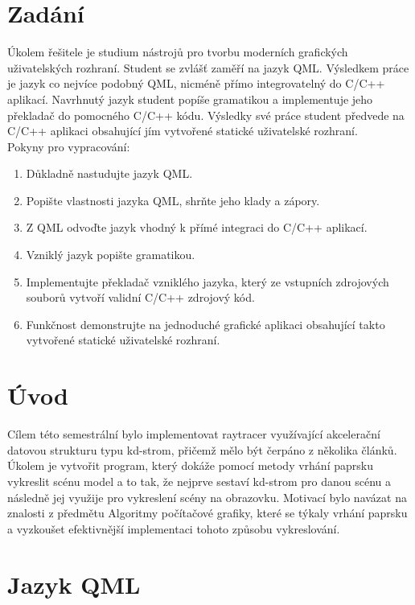 \documentclass[report,11pt]{elsarticle}
\begin{document}
\section{\label{SEC:Intro}Zadání}
Úkolem řešitele je studium nástrojů pro tvorbu moderních grafických uživatelských rozhraní.
Student se zvlášť zaměří na jazyk QML. Výsledkem práce je jazyk co nejvíce podobný QML,
nicméně přímo integrovatelný do C/C++ aplikací. Navrhnutý jazyk student popíše gramatikou a
implementuje jeho překladač do pomocného C/C++ kódu. Výsledky své práce student předvede na
C/C++ aplikaci obsahující jím vytvořené statické uživatelské rozhraní.\\
Pokyny pro vypracování:
\begin{enumerate}
\item Důkladně nastudujte jazyk QML.
\item Popište vlastnosti jazyka QML, shrňte jeho klady a zápory.
\item Z QML odvoďte jazyk vhodný k přímé integraci do C/C++ aplikací.
\item Vzniklý jazyk popište gramatikou.
\item Implementujte překladač vzniklého jazyka, který ze vstupních zdrojových souborů vytvoří
validní C/C++ zdrojový kód.
\item Funkčnost demonstrujte na jednoduché grafické aplikaci obsahující takto vytvořené statické
uživatelské rozhraní.
\end{enumerate}


\section{\label{SEC:Intro}Úvod}
Cílem této semestrální bylo implementovat raytracer využívající akcelerační datovou strukturu typu kd-strom, přičemž mělo být čerpáno z několika článků. Úkolem je vytvořit program, který dokáže pomocí metody vrhání paprsku vykreslit scénu model a to tak, že nejprve sestaví kd-strom pro danou scénu a následně jej využije pro vykreslení scény na obrazovku. Motivací bylo navázat na znalosti z předmětu Algoritmy počítačové grafiky, které se týkaly vrhání paprsku a vyzkoušet efektivnější implementaci tohoto způsobu vykreslování.

\section{\label{SEC:Intro}Jazyk QML}
\end{document}
